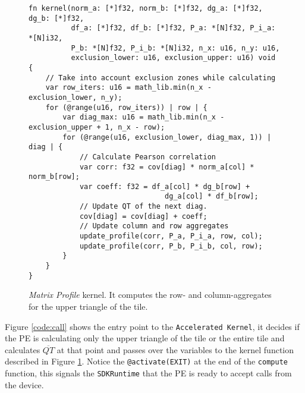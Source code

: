 \begin{figure}[!ht]
    \centering
    \begin{verbatim}
fn kernel(norm_a: [*]f32, norm_b: [*]f32, dg_a: [*]f32, dg_b: [*]f32,
          df_a: [*]f32, df_b: [*]f32, P_a: *[N]f32, P_i_a: *[N]i32,
          P_b: *[N]f32, P_i_b: *[N]i32, n_x: u16, n_y: u16,
          exclusion_lower: u16, exclusion_upper: u16) void {
    // Take into account exclusion zones while calculating
    var row_iters: u16 = math_lib.min(n_x - exclusion_lower, n_y);
    for (@range(u16, row_iters)) | row | {
        var diag_max: u16 = math_lib.min(n_x - exclusion_upper + 1, n_x - row);
        for (@range(u16, exclusion_lower, diag_max, 1)) | diag | {
            // Calculate Pearson correlation
            var corr: f32 = cov[diag] * norm_a[col] * norm_b[row];
            var coeff: f32 = df_a[col] * dg_b[row] +
                                dg_a[col] * df_b[row];
            // Update QT of the next diag.
            cov[diag] = cov[diag] + coeff;
            // Update column and row aggregates
            update_profile(corr, P_a, P_i_a, row, col);
            update_profile(corr, P_b, P_i_b, col, row);
        }
    }
}
\end{verbatim}
\caption{\textit{Matrix Profile} kernel. It computes the row- and column-aggregates for the upper triangle of the tile.}\label{code:profile_calculation}
\label{code:main_kernel}
\end{figure}

Figure \ref{code:call} shows the entry point to the \texttt{Accelerated Kernel}, it decides if the PE is calculating only the upper triangle of the tile or the entire tile and calculates $\overline{QT}$ at that point and passes over the variables to the kernel function described in Figure \ref{code:main_kernel}. Notice the \texttt{@activate(EXIT)} at the end of the \texttt{compute} function, this signals the \texttt{SDKRuntime} that the PE is ready to accept calls from the device.